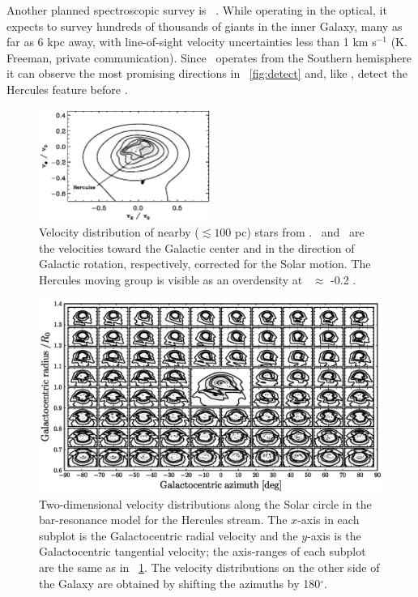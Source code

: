 Another planned spectroscopic survey is
\hermes\ \citep{Freeman10a}. While operating in the optical, it
expects to survey hundreds of thousands of giants in the inner Galaxy,
many as far as 6 kpc away, with line-of-sight velocity uncertainties
less than 1 km s$^{-1}$ (K. Freeman, private communication). Since
\hermes\ operates from the Southern hemisphere it can observe the most
promising directions in \figurename~\ref{fig:detect} and, like
\apogee, detect the Hercules feature before \Gaia.


\clearpage
\begin{figure}
\includegraphics[width=0.5\textwidth]{figs_hercules/veldist.eps}
\caption[Velocity distribution of nearby ($\lesssim 100$ pc)
  stars]{Velocity distribution of nearby ($\lesssim 100$ pc) stars
  from \citet{Bovyveldist}. \vR\ and \vphihercules\ are the velocities
  toward the Galactic center and in the direction of Galactic
  rotation, respectively, corrected for the Solar motion. The Hercules
  moving group is visible as an overdensity at
  \vphihercules\ $\approx$ -0.2 \vo.}\label{fig:obs}
\end{figure}

\clearpage
\begin{figure}
\includegraphics[width=\textwidth]{figs_hercules/rphi2d.ps}
\caption[Two-dimensional velocity distributions along the Solar circle
  in the bar-resonance model for the Hercules stream]{Two-dimensional
  velocity distributions along the Solar circle in the bar-resonance
  model for the Hercules stream. The $x$-axis in each subplot is the
  Galactocentric radial velocity and the $y$-axis is the
  Galactocentric tangential velocity; the axis-ranges of each subplot
  are the same as in \figurename~\ref{fig:obs}. The velocity
  distributions on the other side of the Galaxy are obtained by
  shifting the azimuths by 180$^{\circ}$.}\label{fig:rphi2d}
\end{figure}

